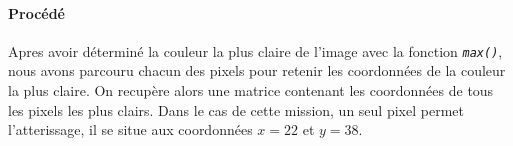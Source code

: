 	\paragraph{Procédé}	Apres avoir déterminé la couleur la plus claire de l'image avec la fonction \emph{\texttt{max()}}, nous avons parcouru chacun des pixels pour retenir les coordonnées de la couleur la plus claire. On recupère alors une matrice contenant les coordonnées de tous les pixels les plus clairs. Dans le cas de cette mission, un seul pixel permet l'atterissage, il se situe aux coordonnées $x=22$ et $y=38$.